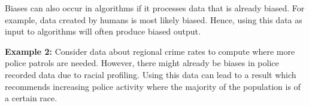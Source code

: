 \documentclass[a4paper]{article}
\begin{document}
Biases can also occur in algorithms if it processes data that is already biased.
For example, data created by humans is most likely biased.
Hence, using this data as input to algorithms will often produce biased output.

\textbf{Example 2:}
Consider data about regional crime rates to compute where more police patrols are needed.
However, there might already be biases in police recorded data due to racial profiling.
Using this data can lead to a result which recommends increasing police activity where the majority of the population is of a certain race.
\end{document}
